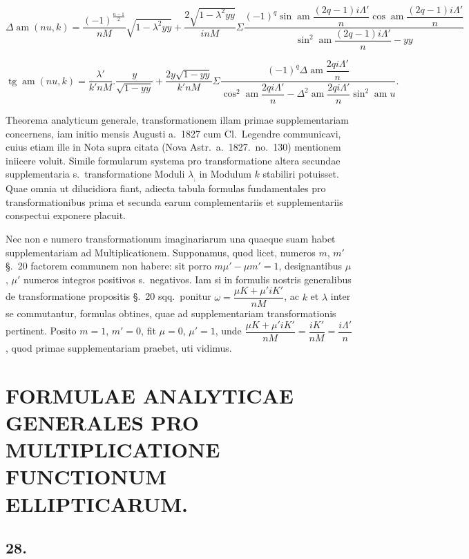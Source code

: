 \documentclass{article}
\begin{document}
\[
\Delta\operatorname{am}(nu,k)=\frac{(-1)^{\frac{n-1}{2}}}{nM}\sqrt{1-\lambda^{2}yy}+\frac{2\sqrt{1-\lambda^{2}yy}}{inM}\Sigma\frac{(-1)^{q}\sin\operatorname{am}\dfrac{(2q-1)i\Lambda'}{n}\cos\operatorname{am}\dfrac{(2q-1)i\Lambda'}{n}}{\sin^{2}\operatorname{am}\dfrac{(2q-1)i\Lambda'}{n}-yy}
\]

\[
\operatorname{tg}\operatorname{am}(nu,k)=\frac{\lambda'}{k'nM}.\frac{y}{\sqrt{1-yy}}+\frac{2y\sqrt{1-yy}}{k'nM}\Sigma\frac{(-1)^{q}\Delta\operatorname{am}\dfrac{2qi\Lambda'}{n}}{\cos^{2}\operatorname{am}\dfrac{2qi\Lambda'}{n}-\Delta^{2}\operatorname{am}\dfrac{2qi\Lambda'}{n}\sin^{2}\operatorname{am}u}.
\]

Theorema analyticum generale, transformationem illam primae supplementariam concernens, iam initio mensis Augusti a.\ 1827 cum Cl.\ Legendre communicavi, cuius etiam ille in Nota supra citata (Nova Astr.\ a.\ 1827.\ no.\ 130) mentionem iniicere voluit. Simile formularum systema pro transformatione altera secundae supplementaria s.\ transformatione Moduli $\lambda_{,}$ in Modulum $k$ stabiliri potuisset. Quae omnia ut dilucidiora fiant, adiecta tabula formulas fundamentales pro transformationibus prima et secunda earum complementariis et supplementariis conspectui exponere placuit.

Nec non e numero transformationum imaginariarum una quaeque suam habet supplementariam ad Multiplicationem. Supponamus, quod licet, numeros $m$, $m'$ §.\ 20 factorem communem non habere: sit porro $m\mu'-\mu m'=1$, designantibus $\mu$, $\mu'$ numeros integros positivos s.\ negativos. Iam si in formulis nostris generalibus de transformatione propositis §.\ 20 sqq.\ ponitur $\omega=\dfrac{\mu K+\mu' iK'}{nM}$, ac $k$ et $\lambda$ inter se commutantur, formulas obtines, quae ad supplementariam transformationis pertinent. Posito $m=1$, $m'=0$, fit $\mu=0$, $\mu'=1$, unde $\dfrac{\mu K+\mu' iK'}{nM}=\dfrac{iK'}{nM}=\dfrac{i\Lambda'}{n}$, quod primae supplementariam praebet, uti vidimus.

\section*{FORMULAE ANALYTICAE GENERALES PRO MULTIPLICATIONE FUNCTIONUM ELLIPTICARUM.}

\subsection*{28.}
\end{document}
